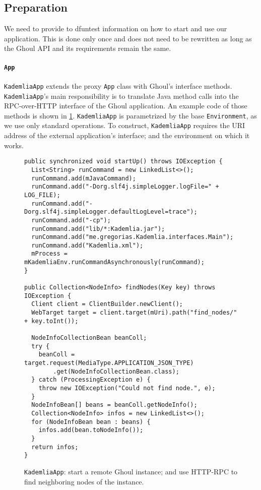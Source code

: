 \subsection{Preparation}
We need to provide to dfuntest information on how to start and use our
application. This is done only once and does not need to be rewritten as long as
the Ghoul API and its requirements remain the same.

\paragraph{\texttt{App}} 
\texttt{KademliaApp} extends the proxy \texttt{App} class with Ghoul's interface methods.
\texttt{KademliaApp}'s main responsibility is to translate Java method calls into the RPC-over-HTTP interface of the Ghoul application.
An example code of those methods is shown in \ref{fig:app_example}.
\texttt{KademliaApp} is parametrized by the base \texttt{Environment}, as we use only standard operations.
To construct, \texttt{KademliaApp} requires the URI address of the external
application's interface; and the environment on which it works.

\begin{figure}[tbp]
\begin{lstlisting}
public synchronized void startUp() throws IOException {
  List<String> runCommand = new LinkedList<>();
  runCommand.add(mJavaCommand);
  runCommand.add("-Dorg.slf4j.simpleLogger.logFile=" + LOG_FILE);
  runCommand.add("-Dorg.slf4j.simpleLogger.defaultLogLevel=trace");
  runCommand.add("-cp");
  runCommand.add("lib/*:Kademlia.jar");
  runCommand.add("me.gregorias.Kademlia.interfaces.Main");
  runCommand.add("Kademlia.xml");
  mProcess = mKademliaEnv.runCommandAsynchronously(runCommand);
}

public Collection<NodeInfo> findNodes(Key key) throws IOException {
  Client client = ClientBuilder.newClient();
  WebTarget target = client.target(mUri).path("find_nodes/" + key.toInt());

  NodeInfoCollectionBean beanColl;
  try {
    beanColl = target.request(MediaType.APPLICATION_JSON_TYPE)
        .get(NodeInfoCollectionBean.class);
  } catch (ProcessingException e) {
    throw new IOException("Could not find node.", e);
  }
  NodeInfoBean[] beans = beanColl.getNodeInfo();
  Collection<NodeInfo> infos = new LinkedList<>();
  for (NodeInfoBean bean : beans) {
    infos.add(bean.toNodeInfo());
  }
  return infos;
}
\end{lstlisting}
\caption{\texttt{KademliaApp}: start a remote Ghoul instance; and use
HTTP-RPC to find neighboring nodes of the instance.}
\label{fig:app_example}
\end{figure}


